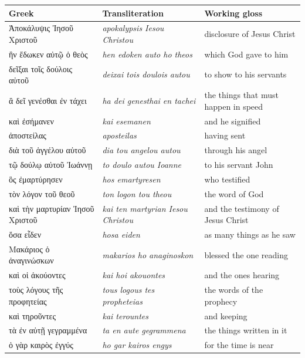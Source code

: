 \begin{center}
\begin{longtable}{L{0.29\textwidth}L{0.32\textwidth}L{0.29\textwidth}}
\toprule
Greek & Transliteration & Working gloss \\
\midrule
\textgreek{Ἀποκάλυψις Ἰησοῦ Χριστοῦ} & \textit{apokalypsis Iesou Christou} & disclosure of Jesus Christ \\
\textgreek{ἣν ἔδωκεν αὐτῷ ὁ θεὸς} & \textit{hen edoken auto ho theos} & which God gave to him \\
\textgreek{δεῖξαι τοῖς δούλοις αὐτοῦ} & \textit{deixai tois doulois autou} & to show to his servants \\
\textgreek{ἃ δεῖ γενέσθαι ἐν τάχει} & \textit{ha dei genesthai en tachei} & the things that must happen in speed \\
\textgreek{καὶ ἐσήμανεν} & \textit{kai esemanen} & and he signified \\
\textgreek{ἀποστείλας} & \textit{aposteilas} & having sent \\
\textgreek{διὰ τοῦ ἀγγέλου αὐτοῦ} & \textit{dia tou angelou autou} & through his angel \\
\textgreek{τῷ δούλῳ αὐτοῦ Ἰωάννῃ} & \textit{to doulo autou Ioanne} & to his servant John \\
\textgreek{ὃς ἐμαρτύρησεν} & \textit{hos emartyresen} & who testified \\
\textgreek{τὸν λόγον τοῦ θεοῦ} & \textit{ton logon tou theou} & the word of God \\
\textgreek{καὶ τὴν μαρτυρίαν Ἰησοῦ Χριστοῦ} & \textit{kai ten martyrian Iesou Christou} & and the testimony of Jesus Christ \\
\textgreek{ὅσα εἶδεν} & \textit{hosa eiden} & as many things as he saw \\
\textgreek{Μακάριος ὁ ἀναγινώσκων} & \textit{makarios ho anaginoskon} & blessed the one reading \\
\textgreek{καὶ οἱ ἀκούοντες} & \textit{kai hoi akouontes} & and the ones hearing \\
\textgreek{τοὺς λόγους τῆς προφητείας} & \textit{tous logous tes propheteias} & the words of the prophecy \\
\textgreek{καὶ τηροῦντες} & \textit{kai terountes} & and keeping \\
\textgreek{τὰ ἐν αὐτῇ γεγραμμένα} & \textit{ta en aute gegrammena} & the things written in it \\
\textgreek{ὁ γὰρ καιρὸς ἐγγύς} & \textit{ho gar kairos engys} & for the time is near \\
\bottomrule
\end{longtable}
\end{center}

